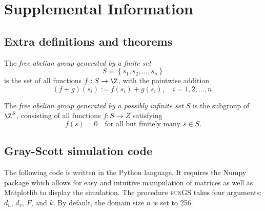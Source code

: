 \chapter{Supplemental Information}

\section{Extra definitions and theorems}

\begin{defn} \label{ap:abeliandef}
	The \textit{free abelian group generated by a finite set}
	$$ S = \left\{s_1, s_2, \ldots, s_n \right\} $$
	is the set of all functions $ f : S \rightarrow \Z$, with the pointwise addition
		$$ (f + g)(s_i) := f(s_i) + g(s_i), \quad i = 1, 2, \ldots, n . $$
\end{defn}

\begin{defn} \label{ap:freeabeliandef}
	The \textit{free abelian group generated by a possibly infinite set} $S$ is the subgroup of $\Z^S$, consisting of all functions $f : S \rightarrow Z$ satisfying
	$$ f(s) = 0 \quad \text{for all but finitely many } s \in S. $$
\end{defn}

\section{Gray-Scott simulation code} \label{appB:gs-code}

The following code is written in the Python language. It requires the Numpy package which allows for easy and intuitive manipulation of matrices as well as Matplotlib to display the simulation. The procedure \textsc{runGS} takes four arguments: $d_u$, $d_v$, $F$, and $k$. By default, the domain size $n$ is set to 256.

